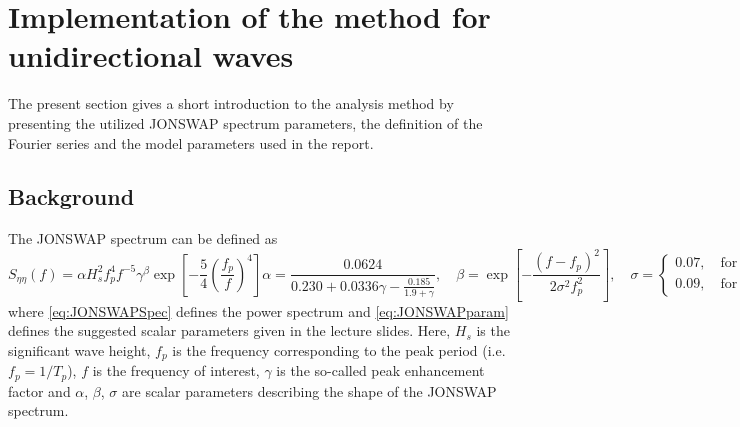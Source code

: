 \chapter{Implementation of the method for unidirectional waves}
The present section gives a short introduction to the analysis method by presenting the utilized JONSWAP spectrum parameters, the definition of the Fourier series and the model parameters used in the report. 
\section{Background}
The JONSWAP spectrum can be defined as
\begin{subequations}
\begin{equation}
    S_{\eta \eta}(f) = \alpha H_s^2 f_p^4 f^{-5} \gamma^\beta \exp{\left[-\frac{5}{4}\left(\frac{f_p}{f}\right)^4\right]}
    \label{eq:JONSWAPSpec}
\end{equation} 
\begin{equation}
    \alpha =\frac{0.0624}{0.230+0.0336\gamma-\frac{0.185}{1.9+\gamma}} ,\quad \beta = \exp{\left[ -\frac{(f-f_p)^2}{2\sigma^2f_p^2} \right]}, \quad
    \sigma =
    \begin{cases}
    0.07, \quad \text{for }f\leq f_p \\
    0.09, \quad \text{for }f> f_p
    \end{cases},
    \label{eq:JONSWAPparam}
\end{equation}
\label{eq:JONSWAP}
\end{subequations}
where \cref{eq:JONSWAPSpec} defines the power spectrum and \cref{eq:JONSWAPparam} defines the suggested scalar parameters given in the lecture slides. Here, $H_s$ is the significant wave height, $f_p$ is the frequency corresponding to the peak period (i.e. $f_p=1/T_p$), $f$ is the frequency of interest, $\gamma$ is the so-called peak enhancement factor and $\alpha$, $\beta$, $\sigma$ are scalar parameters describing the shape of the JONSWAP spectrum. 


